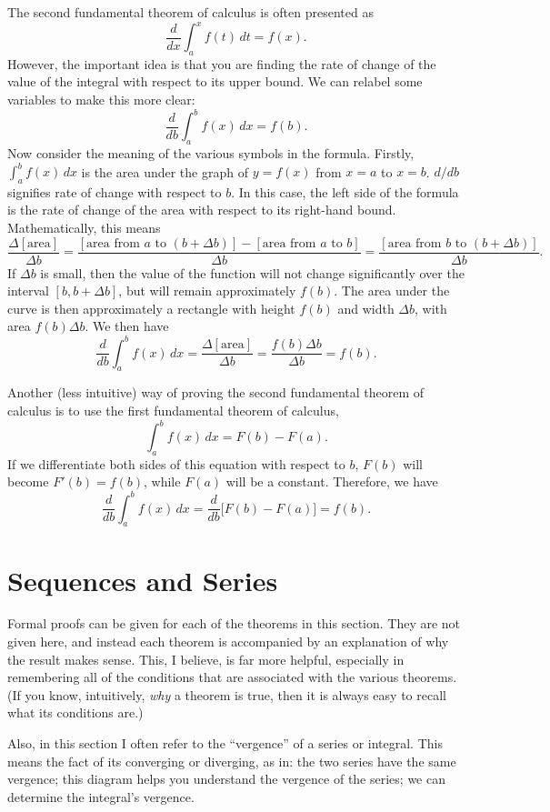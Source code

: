 \documentclass{myarticle}
\theoremstyle{nospace}
\newtheorem{old series theorem}{Theorem}
\newenvironment{series theorem}{\begin{mdframed}\begin{old series theorem}}{\end{old series theorem}\end{mdframed}}
\begin{document}
The second fundamental theorem of calculus is often presented as \[ \frac{d}{dx} \int_a^x f(t) \,dt = f(x). \] However, the important idea is that you are finding the rate of change of the value of the integral with respect to its upper bound. We can relabel some variables to make this more clear: \[ \frac{d}{db} \int_a^b f(x) \, dx = f(b). \] Now consider the meaning of the various symbols in the formula. Firstly, $\int_a^b f(x) \,dx$ is the area under the graph of $y = f(x)$ from $x = a$ to $x = b$. $d/db$ signifies rate of change with respect to $b$. In this case, the left side of the formula is the rate of change of the area with respect to its right-hand bound. Mathematically, this means \[ \frac{\Delta[\text{area}]}{\Delta b} = \frac{[\text{area from $a$ to $(b + \Delta b)$}] - [\text{area from $a$ to $b$}]}{\Delta b} = \frac{[\text{area from $b$ to $(b + \Delta b)$}]}{\Delta b}. \] If $\Delta b$ is small, then the value of the function will not change significantly over the interval $[b, b + \Delta b]$, but will remain approximately $f(b)$. The area under the curve is then approximately a rectangle with height $f(b)$ and width $\Delta b$, with area $f(b) \Delta b$. We then have \[ \frac{d}{db}\int_a^b f(x)\,dx = \frac{\Delta[\text{area}]}{\Delta b} = \frac{f(b)\Delta b}{\Delta b} = f(b). \]

Another (less intuitive) way of proving the second fundamental theorem of calculus is to use the first fundamental theorem of calculus, \[ \int_a^b f(x) \,dx = F(b) - F(a). \] If we differentiate both sides of this equation with respect to $b$, $F(b)$ will become $F'(b) = f(b)$, while $F(a)$ will be a constant. Therefore, we have \[ \frac{d}{db} \int_a^b f(x) \,dx = \frac{d}{db}\bigg[F(b) - F(a)\bigg] = f(b). \]

\section{Sequences and Series} \label{sec:sequences and series}

Formal proofs can be given for each of the theorems in this section. They are not given here, and instead each theorem is accompanied by an explanation of why the result makes sense. This, I believe, is far more helpful, especially in remembering all of the conditions that are associated with the various theorems. (If you know, intuitively, \emph{why} a theorem is true, then it is always easy to recall what its conditions are.)

Also, in this section I often refer to the ``vergence'' of a series or integral. This means the fact of its converging or diverging, as in: the two series have the same vergence; this diagram helps you understand the vergence of the series; we can determine the integral's vergence.
\end{document}
